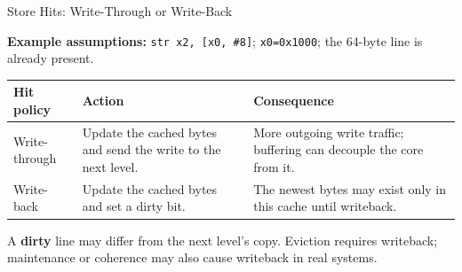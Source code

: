 \documentclass[aspectratio=169,11pt,t]{beamer}
\newcommand{\key}[1]{\textbf{#1}}
\newcommand{\code}[1]{\texttt{#1}}
\newcommand{\Model}[1]{\par{\scriptsize\color{deepblue}\textbf{Example assumptions:} #1\par}\vspace{.14cm}}
\newcommand{\EightWords}[1]{%
  \foreach \i in {0,...,7} {
    \pgfmathtruncatemacro{\off}{8*\i}
    \node[memcell,fill=#1] (word\i) at ({1.26*\i},0) {\off-\the\numexpr\off+7\relax};
  }
}
\begin{document}
\begin{frame}{Store Hits: Write-Through or Write-Back}
\small
\Model{\code{str x2, [x0, \#8]}; \code{x0=0x1000}; the 64-byte line is already present.}
\begin{center}
\end{center}
\renewcommand{\arraystretch}{1.35}
\begin{tabular}{R{3.0cm}R{5.1cm}R{4.9cm}}
\toprule
\textbf{Hit policy} & \textbf{Action} & \textbf{Consequence}\\
\midrule
Write-through & Update the cached bytes and send the write to the next level. & More outgoing write traffic; buffering can decouple the core from it.\\
Write-back & Update the cached bytes and set a dirty bit. & The newest bytes may exist only in this cache until writeback.\\
\bottomrule
\end{tabular}\par
\vspace{.18cm}
\small A \key{dirty} line may differ from the next level's copy. Eviction requires writeback; maintenance or coherence may also cause writeback in real systems.
\end{frame}
\end{document}
